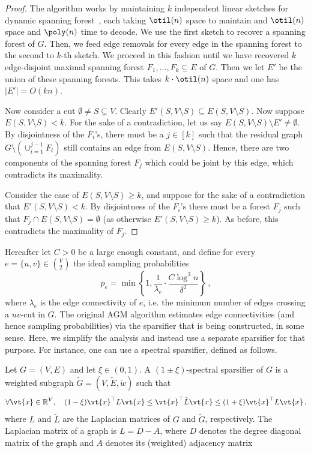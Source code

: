 \begin{proof}
	The algorithm works by maintaining $k$ independent linear sketches for dynamic spanning forest~\cite{linmeas}, each taking $\otil(n)$ space to maintain and $\otil(n)$ space and $\poly(n)$ time to decode. We use the first sketch to recover a spanning forest of $G$. Then, we feed edge removals for every edge in the spanning forest to the second to $k$-th sketch. We proceed in this fashion until we have recovered $k$ edge-disjoint maximal spanning forest $F_1, \dots, F_k \subseteq E$ of $G$. Then we let $E'$ be the union of these spanning forests. This takes $k \cdot \otil(n)$ space and one has $|E'| = O(kn)$.
	
	Now consider a cut $\emptyset \neq S \subsetneq V$. Clearly $E'(S,V \setminus S) \subseteq E(S,V \setminus S)$. Now suppose $E(S,V \setminus S) < k$. For the sake of a contradiction, let us say $E(S,V \setminus S) \setminus E' \neq \emptyset$. By disjointness of the $F_i$'s, there must be a $j \in [k]$ such that the residual graph $G \setminus (\cup_{i=1}^{j-1} F_i)$ still contains an edge from $E(S,V \setminus S)$. Hence, there are two components of the spanning forest $F_j$ which could be joint by this edge, which contradicts its maximality.
	
	Consider the case of $E(S,V \setminus S) \ge k$, and suppose for the sake of a contradiction that $E'(S,V \setminus S) < k$. By disjointness of the $F_i$'s there must be a forest $F_j$ such that $F_j \cap E(S,V \setminus S) = \emptyset$ (as otherwise $E'(S,V \setminus S) \ge k$). As before, this contradicts the maximality of $F_j$.
\end{proof}
\noindent
Hereafter let $C>0$ be a large enough constant, and define for every $e=\{u,v\} \in \binom{V}{2}$ the ideal sampling probabilities
\begin{equation*}
	p_e = \min \left\{1, \frac{1}{\lambda_e}\cdot\frac{C \log^3 n}{\delta^2} \right\} \, ,
\end{equation*}
where $\lambda_e$ is the edge connectivity of $e$, i.e. the minimum number of edges crossing a $uv$-cut in $G$. The original AGM algorithm estimates edge connectivities (and hence sampling probabilities) via the sparsifier that is being constructed, in some sense. Here, we simplify the analysis and instead use a separate sparsifier for that purpose. For instance, one can use a spectral sparsifier, defined as follows.
\begin{definition}
	Let $G=(V,E)$ and let $\xi \in (0,1)$. A $(1\pm \xi)$-spectral sparsifier of $G$ is a weighted subgraph $\tilde{G} = (V,\tilde{E},\tilde{w})$ such that
	\begin{equation*}
		\forall \vt{x} \in \mathbb{R}^V , \quad (1-\xi)\vt{x}^\top L \vt{x} \le \vt{x}^\top \tilde{L} \vt{x} \le (1+\xi)\vt{x}^\top L \vt{x} \, ,
	\end{equation*}
	where $L$ and  $\tilde{L}$ are the Laplacian matrices of $G$ and $\tilde{G}$, respectively.
	The Laplacian matrix of a graph is $L=D-A$, where $D$ denotes the degree diagonal matrix of the graph and $A$ denotes its (weighted) adjacency matrix
\end{definition}\noindent

